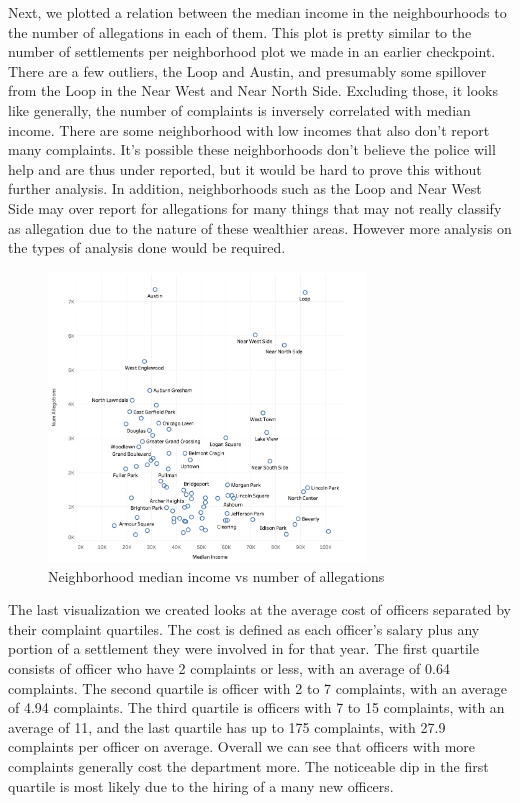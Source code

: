 \documentclass[11pt]{article}
\begin{document}
Next, we plotted a relation between the median income in the neighbourhoods to the number of allegations in each of them. This plot is pretty similar to the number of settlements per neighborhood plot we made in an earlier checkpoint. There are a few outliers, the Loop and Austin, and presumably some spillover from the Loop in the Near West and Near North Side. Excluding those, it looks like generally, the number of complaints is inversely correlated with median income. There are some neighborhood with low incomes that also don’t report many complaints. It’s possible these neighborhoods don’t believe the police will help and are thus under reported, but it would be hard to prove this without further analysis. In addition, neighborhoods such as the Loop and Near West Side may over report for allegations for many things that may not really classify as allegation due to the nature of these wealthier areas. However more analysis on the types of analysis done would be required.


\begin{figure}[h]
\centering
\caption{Neighborhood median income vs number of allegations}
\includegraphics[width=0.75\textwidth]{scatter.png}
\end{figure}

The last visualization we created looks at the average cost of officers separated by their complaint quartiles. The cost is defined as each officer's salary plus any portion of a settlement they were involved in for that year. The first quartile consists of officer who have 2 complaints or less, with an average of 0.64 complaints. The second quartile is officer with 2 to 7 complaints, with an average of 4.94 complaints. The third quartile is officers with 7 to 15 complaints, with an average of 11, and the last quartile has up to 175 complaints, with 27.9 complaints per officer on average. Overall we can see that officers with more complaints generally cost the department more. The noticeable dip in the first quartile is most likely due to the hiring of a many new officers.
\end{document}
